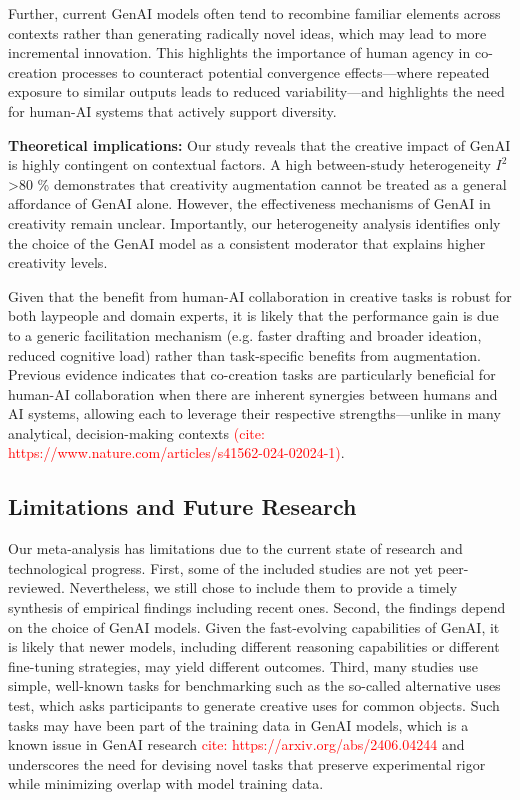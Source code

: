 \documentclass[manuscript, screen, review, acmsmall, anonymous]{acmart}
\newcommand{\TODO}[1]{\textcolor{red}{#1}}
\begin{document}
Further, current GenAI models often tend to recombine familiar elements \cite{LeeChung2024} across contexts rather than generating radically novel ideas, which may lead to more incremental innovation. This highlights the importance of human agency in co-creation processes to counteract potential convergence effects---where repeated exposure to similar outputs leads to reduced variability---and highlights the need for human-AI systems that actively support diversity.


\textbf{Theoretical implications:} Our study reveals that the creative impact of GenAI is highly contingent on contextual factors. A high between-study heterogeneity $I^{2}$ >80 \% demonstrates that creativity augmentation cannot be treated as a general affordance of GenAI alone. However, the effectiveness mechanisms of GenAI in creativity remain unclear. Importantly, our heterogeneity analysis identifies only the choice of the GenAI model as a consistent moderator that explains higher creativity levels. 

Given that the benefit from human-AI collaboration in creative tasks is robust for both laypeople and domain experts, it is likely that the performance gain is due to a generic facilitation mechanism (e.g. faster drafting and broader ideation, reduced cognitive load) rather than task-specific benefits from augmentation. Previous evidence indicates that co-creation tasks are particularly beneficial for human-AI collaboration when there are inherent synergies between humans and AI systems, allowing each to leverage their respective strengths---unlike in many analytical, decision-making contexts  \TODO{(cite: https://www.nature.com/articles/s41562-024-02024-1)}.


\subsection{Limitations and Future Research}

Our meta-analysis has limitations due to the current state of research and technological progress. First, some of the included studies are not yet peer-reviewed. Nevertheless, we still chose to include them to provide a timely synthesis of empirical findings including recent ones. Second, the findings depend on the choice of GenAI models. Given the fast-evolving capabilities of GenAI, it is likely that newer models, including different reasoning capabilities or different fine-tuning strategies, may yield different outcomes. Third, many studies use simple, well-known tasks for benchmarking such as the so-called alternative uses test, which asks participants to generate creative uses for common objects. Such tasks may have been part of the training data in GenAI models, which is a known issue in GenAI research \TODO{cite: https://arxiv.org/abs/2406.04244} and underscores the need for devising novel tasks that preserve experimental rigor while minimizing overlap with model training data.
\end{document}
